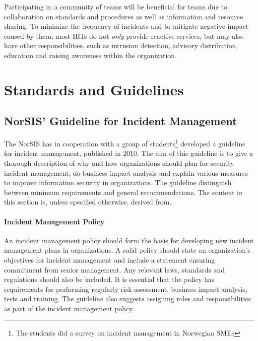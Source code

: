 Participating in a community of teams will be beneficial for teams due to collaboration on standards and procedures as well as information and resource sharing. To minimize the frequency of incidents and to mitigate negative impact caused by them, most \acp{IRT} do not \emph{only} provide reactive services, but may also have other responsibilities, such as intrusion detection, advisory distribution, education and raising awareness within the organization\cite{nist800-61}.  
  

\section{Standards and Guidelines}
\label{section:standardsandguidelines}







\subsection{NorSIS' Guideline for Incident Management}
The \ac{NorSIS} has in cooperation with a group of students\footnote{The students did a survey on incident management in Norwegian \acsp{SME}\cite{sand2010hendelseshaandtering}} developed a guideline for incident management, published in 2010\cite{norsisveiledning}. The aim of this guideline is to give a thorough description of why and how organizations should plan for security incident management, do business impact analysis and explain various measures to improve information security in organizations. The guideline distinguish between minimum requirements and general recommendations. The content in this section is, unless specified otherwise, derived from\cite{norsisveiledning}.

\paragraph{Incident Management Policy} 
An incident management policy should form the basis for developing new incident management plans in organizations. A solid policy should state an organization's objectives for incident management and include a statement ensuring commitment from senior management. Any relevant laws, standards and regulations should also be included. It is essential that the policy has requirements for performing regularly risk assessment, business impact analysis, tests and training. The guideline also suggests assigning roles and responsibilities as part of the incident management policy.

